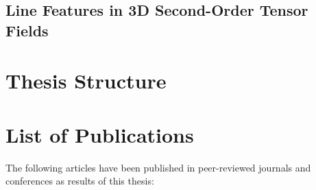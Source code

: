\subsection{Line Features in \ac{3D} Second-Order Tensor Fields} %
\label{sub:contr_tensor_fields}
%

%
%
%
\section{Thesis Structure} %
\label{sec:thesis_structure}
%

%
%
\clearpage
\section{List of Publications} %
\label{sec:list_of_publications}
%
The following articles have been published in peer-reviewed journals and
conferences as results of this thesis:
%
%

